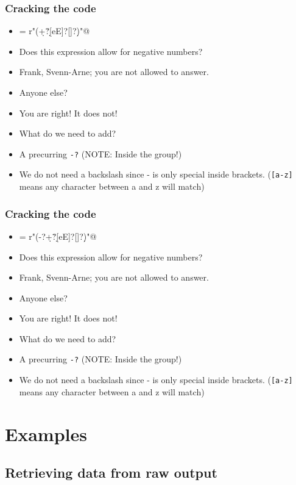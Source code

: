 \documentclass{beamer}
\begin{document}
\begin{frame}[fragile]
\frametitle{Cracking the code}
\scriptsize
\begin{itemize}
\item \verb@anyNumber = r"\s*(\d+\.?\d*[eE]?[\-\+]?\d*)\s*"@
\pause \item Does this expression allow for negative numbers?
\pause \item Frank, Svenn-Arne; you are not allowed to answer.
\pause \item Anyone else?
\pause \item You are right! It does not!
\item What do we need to add?
\pause \item A precurring \verb+-?+ (NOTE: Inside the group!)
\pause \item We do not need a backslash since - is only special inside brackets. (\verb+[a-z]+ means any character between a and z will match)
\end{itemize}
\normalsize
\end{frame}

\begin{frame}[fragile]
\frametitle{Cracking the code}
\scriptsize
\begin{itemize}
\item \verb@anyNumber = r"\s*(-?\d+\.?\d*[eE]?[\-\+]?\d*)\s*"@
\item Does this expression allow for negative numbers?
\item Frank, Svenn-Arne; you are not allowed to answer.
\item Anyone else?
\item You are right! It does not!
\item What do we need to add?
\item A precurring \verb+-?+ (NOTE: Inside the group!)
\item We do not need a backslash since - is only special inside brackets. (\verb+[a-z]+ means any character between a and z will match)
\end{itemize}
\normalsize
\end{frame}

\section{Examples}
\subsection{Retrieving data from raw output}
\end{document}
